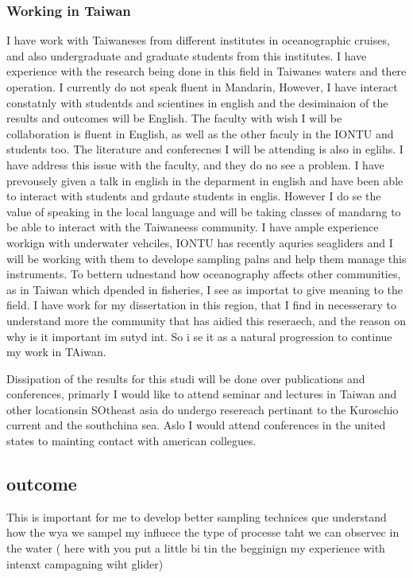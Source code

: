 \documentclass[letterpaper, 12pt ]{article}
\begin{document}
\subsubsection{Working in Taiwan}
I have work with Taiwaneses from different institutes in oceanographic cruises, and also undergraduate and graduate students from this institutes. I have experience with the research being done in this field in Taiwanes waters and there operation.
I currently do not speak fluent in Mandarin, However, I have interact constatnly with studentds and scientines in english and the desiminaion of the results and outcomes will be English. The faculty with wish I will be collaboration is fluent in English, as well as the other faculy in the IONTU and students too. The literature and conferecnes I will be attending is also in eglihs. I have address this issue with the faculty, and they do no see a problem. I have prevousely given a talk in english in the deparment in english and have been able to interact with students and grdaute students in englis. However I do se the value of speaking in the local language and will be taking classes of mandarng to be able to interact with the Taiwaneess community. 
I have ample experience workign with underwater vehciles, IONTU has recently aquries seagliders and I will be working with them to develope sampling palns and help them manage this instruments. 
To bettern udnestand how oceanography affects other communities, as in Taiwan which dpended in fisheries, I see as importat to give meaning to the field. I have work for my dissertation in this region, that I find in necesserary to understand more the community that has aidied this reseraech, and the reason on why is it important im sutyd int. So i se it as a natural progression to continue my work in TAiwan. 

Dissipation of the results for this studi will be done over publications and conferences, primarly I would like to attend seminar and lectures in Taiwan and other locationsin SOtheast asia do undergo resereach pertinant to the Kuroschio current and the southchina sea. Aslo  I would attend conferences in the united states to mainting contact with american collegues. 


\subsection{outcome}
This is important for me to develop better sampling technices que understand how the wya we sampel my influece the type of processe taht we can observec in the water ( here with you put a little bi tin the begginign my experience with intenxt campagning wiht glider) 
\end{document}
